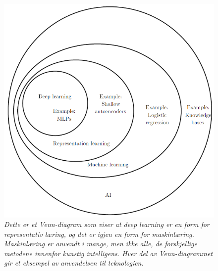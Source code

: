 \begin{figure} 
\begin{center} 
\includegraphics[scale=0.7]{figures/ai}
\caption{\small \sl Dette er et Venn-diagram som viser at deep learning er en form for representativ læring, og det er igjen en form for maskinlæring. Maskinlæring er anvendt i mange, men ikke alle, de forskjellige metodene innenfor kunstig intelligens. Hver del av Venn-diagrammet gir et eksempel av anvendelsen til teknologien. \cite{Goodfellow m.fl. 2016 s. 9} \label{fig:ai}} 
\end{center} 
\end{figure} 

